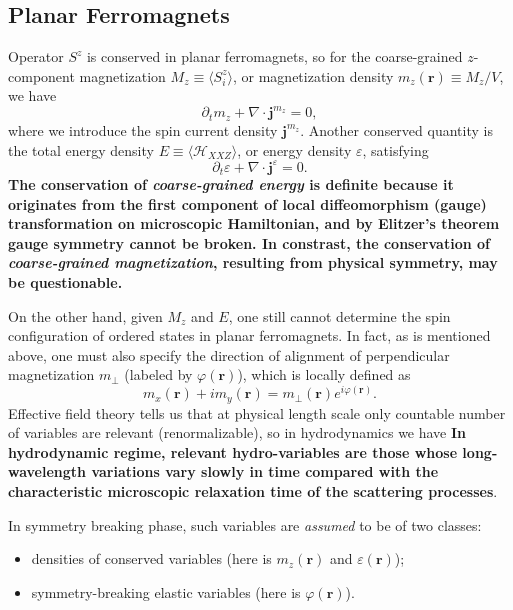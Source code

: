 \documentclass[10pt,nofootinbib,letterpaper]{revtex4}
\newcounter{Def}[section]
\newenvironment{Def}[1][]{{\par\normalfont\bfseries \underline{Definition~\stepcounter{Def}\arabic{Def}.}~#1~~}}{\par}
\def\H{\mathcal{H}}
\begin{document}
	\subsection{Planar Ferromagnets}
		Operator $S^z$ is conserved in planar ferromagnets, so for the coarse-grained $z$-component magnetization $M_z\equiv\langle S_i^z\rangle$, or magnetization density $m_z(\bm{r})\equiv M_z/V$, we have
		\begin{equation}\label{1.1.2}
			\partial_t m_z+\nabla\cdot\bm{j}^{m_z}=0,
		\end{equation}
		where we introduce the spin current density $\bm{j}^{m_z}$. Another conserved quantity is the total energy density $E\equiv\langle \H_{XXZ}\rangle$, or energy density $\varepsilon$, satisfying
		\begin{equation}\label{1.1.3}
			\partial_t \varepsilon+\nabla\cdot\bm{j}^\varepsilon=0.
		\end{equation}
		\textbf{The conservation of \emph{coarse-grained energy} is definite because it originates from the first component of local diffeomorphism (gauge) transformation on microscopic Hamiltonian, and by Elitzer's theorem gauge symmetry cannot be broken. In constrast, the conservation of \emph{coarse-grained magnetization}, resulting from physical symmetry, may be questionable.}\par
		On the other hand, given $M_z$ and $E$, one still cannot determine the spin configuration of ordered states in planar ferromagnets. In fact, as is mentioned above, one must also specify the direction of alignment of perpendicular magnetization $m_\perp$ (labeled by $\varphi(\bm{r})$), which is locally defined as
		\begin{equation*}
			m_x(\bm{r})+im_y(\bm{r})=m_\perp(\bm{r})e^{i\varphi(\bm{r})}.
		\end{equation*}
		\indent Effective field theory tells us that at physical length scale only countable number of variables are relevant (renormalizable), so in hydrodynamics we have
		\begin{Def}[(Hydro-variables)]
			\textbf{\color{red}In hydrodynamic regime, relevant hydro-variables are those whose long-wavelength variations vary slowly in time compared with the characteristic microscopic relaxation time of the scattering processes}.
		\end{Def}
		In symmetry breaking phase, such variables are \emph{assumed} to be of two classes:
		\begin{itemize}
			\item densities of conserved variables (here is $m_z(\bm{r})$ and $\varepsilon(\bm{r})$);
			\item symmetry-breaking elastic variables (here is $\varphi(\bm{r})$).
		\end{itemize}
\end{document}
